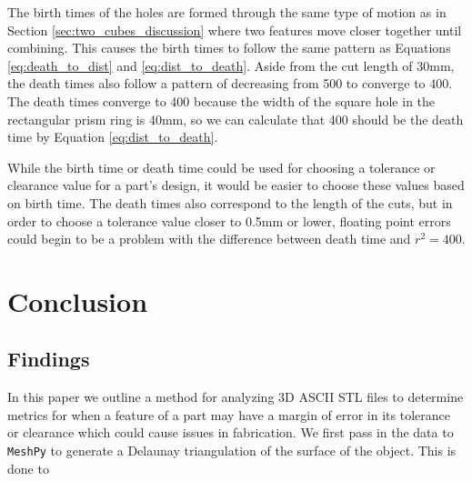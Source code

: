 \documentclass[ma]{uncgdissertationexp}
\theoremstyle{plain}
\theoremstyle{definition}
\theoremstyle{remark}
\begin{document}
\par The birth times of the holes are formed through the same type of motion as in Section \ref{sec:two_cubes_discussion} where two features move closer together until combining. This causes the birth times to follow the same pattern as Equations \ref{eq:death_to_dist} and \ref{eq:dist_to_death}. Aside from the cut length of 30mm, the death times also follow a pattern of decreasing from 500 to converge to 400. The death times converge to 400 because the width of the square hole in the rectangular prism ring is 40mm, so we can calculate that 400 should be the death time by Equation \ref{eq:dist_to_death}.
\par While the birth time or death time could be used for choosing a tolerance or clearance value for a part's design, it would be easier to choose these values based on birth time. The death times also correspond to the length of the cuts, but in order to choose a tolerance value closer to 0.5mm or lower, floating point errors could begin to be a problem with the difference between death time and $r^{2} = 400$.
\chapter{Conclusion}

\section{Findings}\par In this paper we outline a method for analyzing 3D ASCII STL files to determine metrics for when a feature of a part may have a margin of error in its tolerance or clearance which could cause issues in fabrication. We first pass in the data to \verb"MeshPy" to generate a Delaunay triangulation of the surface of the object. This is done to 
\end{document}
